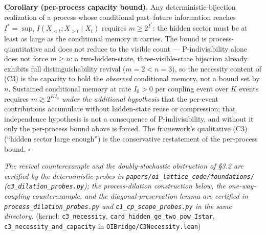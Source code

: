 \documentclass[
]{article}
\begin{document}
\textbf{Corollary (per-process capacity bound).} Any
deterministic-bijection realization of a process whose conditional
past--future information reaches
\(I^* = \sup_t I(X_{<t} ; X_{>t} \mid X_t)\) requires
\(m \geq 2^{I^*}\): the hidden sector must be at least as large as the
conditional memory it carries. The bound is process-quantitative and
does not reduce to the visible count --- P-indivisibility alone does not
force \(m \geq n\): a two-hidden-state, three-visible-state bijection
already exhibits full distinguishability revival (\(m = 2 < n = 3\)), so
the necessity content of (C3) is the capacity to hold the
\emph{observed} conditional memory, not a bound set by \(n\). Sustained
conditional memory at rate \(I_0 > 0\) per coupling event over \(K\)
events requires \(m \gtrsim 2^{K I_0}\) \emph{under the additional
hypothesis} that the per-event contributions accumulate without
hidden-state reuse or compression; that independence hypothesis is not a
consequence of P-indivisibility, and without it only the per-process
bound above is forced. The framework's qualitative (C3) (``hidden sector
large enough'') is the conservative restatement of the per-process
bound. \(\square\)

\emph{The revival counterexample and the doubly-stochastic obstruction
of §3.2 are certified by the deterministic probes in
\texttt{papers/oi\_lattice\_code/foundations/}
(\texttt{c3\_dilation\_probes.py}); the process-dilation construction
below, the one-way-coupling counterexample, and the
diagonal-preservation lemma are certified in
\texttt{process\_dilation\_probes.py} and
\texttt{c1\_cp\_scope\_probes.py} in the same directory.} (kernel:
\texttt{c3\_necessity}, \texttt{card\_hidden\_ge\_two\_pow\_Istar},
\texttt{c3\_necessity\_and\_capacity} in
\texttt{OIBridge/C3Necessity.lean})
\end{document}
